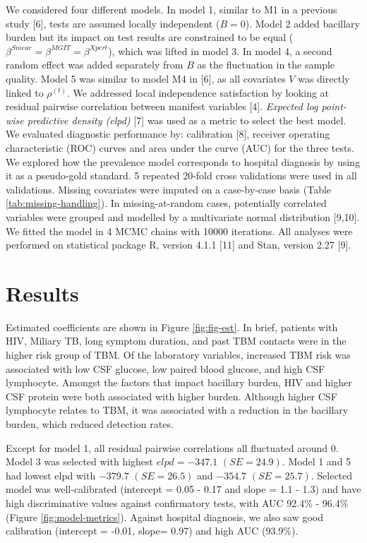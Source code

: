 \documentclass[
]{article}
\begin{document}
We considered four different models. In model 1, similar to M1 in a previous study {[}6{]}, tests are assumed locally independent (\(B = 0\)). Model 2 added bacillary burden but its impact on test results are constrained to be equal (\(\beta^{Smear} = \beta^{MGIT} = \beta^{Xpert}\)), which was lifted in model 3. In model 4, a second random effect was added separately from \(B\) as the fluctuation in the sample quality. Model 5 was similar to model M4 in {[}6{]}, as all covariates \(V\) was directly linked to \(\rho^{(t)}\). We addressed local independence satisfaction by looking at residual pairwise correlation between manifest variables {[}4{]}. \emph{Expected log point-wise predictive density (elpd)} {[}7{]} was used as a metric to select the best model. We evaluated diagnostic performance by: calibration {[}8{]}, receiver operating characteristic (ROC) curves and area under the curve (AUC) for the three tests. We explored how the prevalence model corresponds to hospital diagnosis by using it as a pseudo-gold standard. 5 repeated 20-fold cross validations were used in all validations. Missing covariates were imputed on a case-by-case basis (Table \ref{tab:missing-handling}). In missing-at-random cases, potentially correlated variables were grouped and modelled by a multivariate normal distribution {[}9,10{]}. We fitted the model in 4 MCMC chains with 10000 iterations. All analyses were performed on statistical package \textsf{R}, version 4.1.1 {[}11{]} and \textsf{Stan}, version 2.27 {[}9{]}.

\hypertarget{results}{%
\section{Results}\label{results}}

Estimated coefficients are shown in Figure \ref{fig:fig-est}. In brief, patients with HIV, Miliary TB, long symptom duration, and past TBM contacts were in the higher risk group of TBM. Of the laboratory variables, increased TBM risk was associated with low CSF glucose, low paired blood glucose, and high CSF lymphocyte. Amongst the factors that impact bacillary burden, HIV and higher CSF protein were both associated with higher burden. Although higher CSF lymphocyte relates to TBM, it was associated with a reduction in the bacillary burden, which reduced detection rates.

Except for model 1, all residual pairwise correlations all fluctuated around 0. Model 3 was selected with highest \(elpd = -347.1\) \((SE = 24.9)\). Model 1 and 5 had lowest elpd with \(-379.7\) \((SE = 26.5)\) and \(-354.7\) \((SE = 25.7)\). Selected model was well-calibrated (intercept = 0.05 - 0.17 and slope = 1.1 - 1.3) and have high discriminative values against confirmatory tests, with AUC 92.4\% - 96.4\% (Figure \ref{fig:model-metrics}). Against hospital diagnosis, we also saw good calibration (intercept = -0.01, slope= 0.97) and high AUC (93.9\%).
\end{document}
